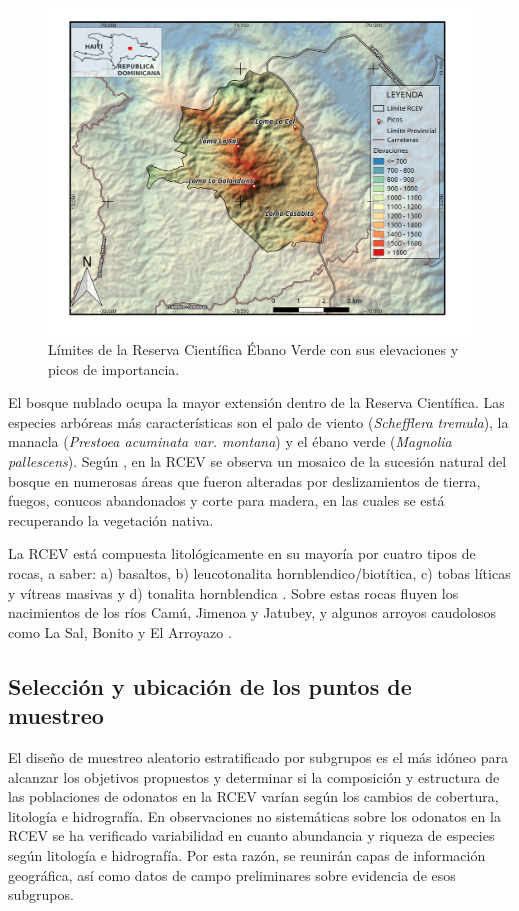 \documentclass[12pt,letterpaper,spanish]{article}
\begin{document}
\begin{figure}[h!]
\centering
  \includegraphics[width=\linewidth]{mapaRCEV.jpeg}
  \caption{Límites de la Reserva Científica Ébano Verde con sus elevaciones y picos de importancia.}
  \label{fig:mapaRCEV}
\end{figure}

El bosque nublado ocupa la mayor extensión dentro de la Reserva Científica. Las especies arbóreas más características son el palo de viento (\textit{Schefflera tremula}), la manacla (\textit{Prestoea acuminata var. montana}) y el ébano verde (\textit{Magnolia pallescens}). Según \citet{garcia1994composicion}, en la RCEV se observa un mosaico de la sucesión natural del bosque en numerosas áreas que fueron alteradas por deslizamientos de tierra, fuegos, conucos abandonados y corte para madera, en las cuales se está recuperando la vegetación nativa.

La RCEV está compuesta litológicamente en su mayoría por cuatro tipos de rocas, a saber: a) basaltos, b) leucotonalita hornblendico/biotítica, c) tobas líticas y vítreas masivas y d) tonalita hornblendica \citep{servicio2000mapageol}. Sobre estas rocas fluyen los nacimientos de los ríos Camú, Jimenoa y Jatubey, y algunos arroyos caudolosos como La Sal, Bonito y El Arroyazo \citep{fern2015reservas}.

\subsection{Selección y ubicación de los puntos de muestreo}

El diseño de muestreo aleatorio estratificado por subgrupos  \citep{krebs1989ecological, triola2009estadistica} es el más idóneo para alcanzar los objetivos propuestos y determinar si la composición y estructura de las poblaciones de odonatos en la RCEV varían según los cambios de cobertura, litología e hidrografía. En observaciones no sistemáticas sobre los odonatos en la RCEV se ha verificado variabilidad en cuanto abundancia y riqueza de especies según litología e hidrografía. Por esta razón, se reunirán capas de información geográfica, así como datos de campo preliminares sobre evidencia de esos subgrupos.
\end{document}
